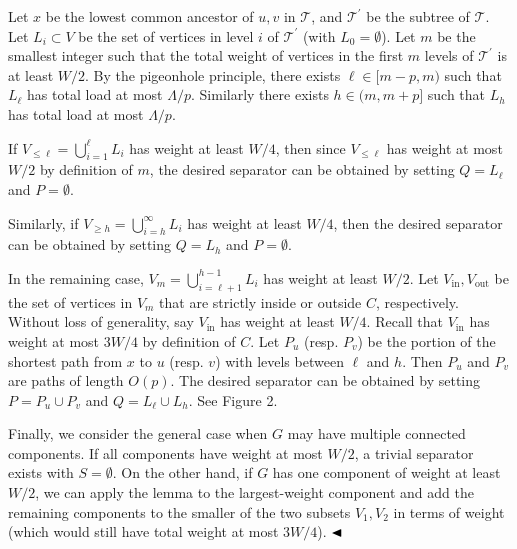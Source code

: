 Let $x$ be the lowest common ancestor of $u,v$ in $\mathcal{T}$, and $\mathcal{T}^{\prime}$ be the subtree of $\mathcal{T}$. Let $L_{i}\subset V$ be the set of vertices in level $i$ of $\mathcal{T}^{\prime}$ (with $L_{0}=\emptyset$). Let $m$ be the smallest integer such that the total weight of vertices in the first $m$ levels of $\mathcal{T}^{\prime}$ is at least $W/2$. By the pigeonhole principle, there exists $\ell\in[m-p,m)$ such that $L_{\ell}$ has total load at most $\Lambda/p$. Similarly there exists $h\in(m,m+p]$ such that $L_{h}$ has total load at most $\Lambda/p$.
\par
\par
If $V_{\leq\ell}=\bigcup_{i=1}^{\ell}L_{i}$ has weight at least $W/4$, then since $V_{\leq\ell}$ has weight at most $W/2$ by definition of $m$, the desired separator can be obtained by setting $Q=L_{\ell}$ and $P=\emptyset$.
\par
\par
Similarly, if $V_{\geq h}=\bigcup_{i=h}^{\infty}L_{i}$ has weight at least $W/4$, then the desired separator can be obtained by setting $Q=L_{h}$ and $P=\emptyset$.
\par
\par
In the remaining case, $V_{m}=\bigcup_{i=\ell+1}^{h-1}L_{i}$ has weight at least $W/2$. Let $V_{\mathrm{in}},V_{\mathrm{out}}$ be the set of vertices in $V_{m}$ that are strictly inside or outside $C$, respectively. Without loss of generality, say $V_{\mathrm{in}}$ has weight at least $W/4$. Recall that $V_{\mathrm{in}}$ has weight at most $3W/4$ by definition of $C$. Let $P_{u}$ (resp. $P_{v}$) be the portion of the shortest path from $x$ to $u$ (resp. $v$) with levels between $\ell$ and $h$. Then $P_{u}$ and $P_{v}$ are paths of length $O(p)$. The desired separator can be obtained by setting $P=P_{u}\cup P_{v}$ and $Q=L_{\ell}\cup L_{h}$. See Figure 2.
\par
\par
Finally, we consider the general case when $G$ may have multiple connected components. If all components have weight at most $W/2$, a trivial separator exists with $S=\emptyset$. On the other hand, if $G$ has one component of weight at least $W/2$, we can apply the lemma to the largest-weight component and add the remaining components to the smaller of the two subsets $V_{1},V_{2}$ in terms of weight (which would still have total weight at most $3W/4$). $\hfill\blacktriangleleft$
